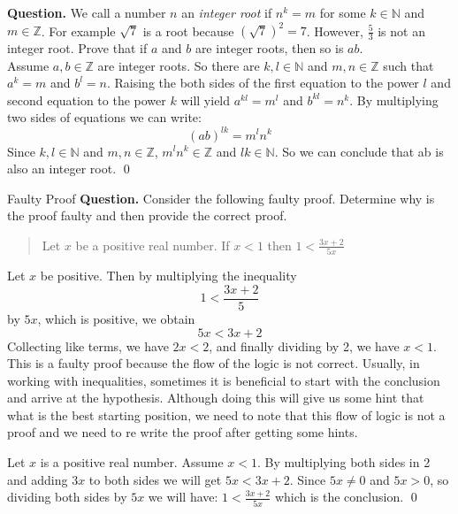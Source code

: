 \begin{example}{}
	\textbf{Question.} We call a number $ n $ an \emph{integer root} if $ n^k=m $ for some $ k \in \mathbb{N} $ and $ m \in \mathbb{Z} $. For example $ \sqrt{7} $ is a root because $ (\sqrt{7})^2 = 7 $. However, $ \frac{5}{3} $ is not an integer root. Prove that if $ a $ and $ b $ are integer roots, then so is $ ab $. \\
	
	 Assume $ a,b \in \mathbb{Z} $ are integer roots. So there are $ k,l \in \mathbb{N} $ and $ m,n \in \mathbb{Z} $ such that $ a^k = m $ and $ b^l=n $. Raising the both sides of the first equation to the power $ l $ and second equation to the power $ k $ will yield $ a^{kl} = m^l $ and $ b^{kl} = n^k $. By multiplying two sides of equations we can write:
	\[ (ab)^{lk} = m^l n^k \] 
	Since $ k,l \in \mathbb{N} $ and $ m,n \in \mathbb{Z} $, $ m^l n^k \in \mathbb{Z} $ and $ lk \in \mathbb{N} $. So we can conclude that ab is also an integer root. \qed
\end{example}

\begin{example}{Faulty Proof}
	\textbf{Question.} Consider the following faulty proof. Determine why is the proof faulty and then provide the correct proof.
	\begin{quote}
		\centering
		Let $ x $ be a positive real number. If $ x<1 $ then $ 1 < \frac{3x+2}{5x} $
	\end{quote}
	
	 Let $ x $ be positive. Then by multiplying the inequality 
	\[ 1 < \frac{3x+2}{5} \]
	by $ 5x $, which is positive, we obtain
	\[ 5x < 3x + 2 \]
	Collecting like terms, we have $ 2x < 2 $, and finally dividing by 2, we have $ x < 1 $. \\
	
	 This is a faulty proof because the flow of the logic is not correct. Usually, in working with inequalities, sometimes it is beneficial to start with the conclusion and arrive at the hypothesis. Although doing this will give us some hint that what is the best starting position, we need to note that this flow of logic is not a proof and we need to re write the proof after getting some hints.
	
	 Let $ x $ is a positive real number. Assume $ x < 1 $. By multiplying both sides in 2 and adding $ 3x $ to both sides we will get $ 5x < 3x+2 $. Since $ 5x \neq 0 $ and $ 5x > 0 $, so dividing both sides by $ 5x $ we will have: $ 1 < \frac{3x+2}{5x} $ which is the conclusion. \qed
\end{example}











